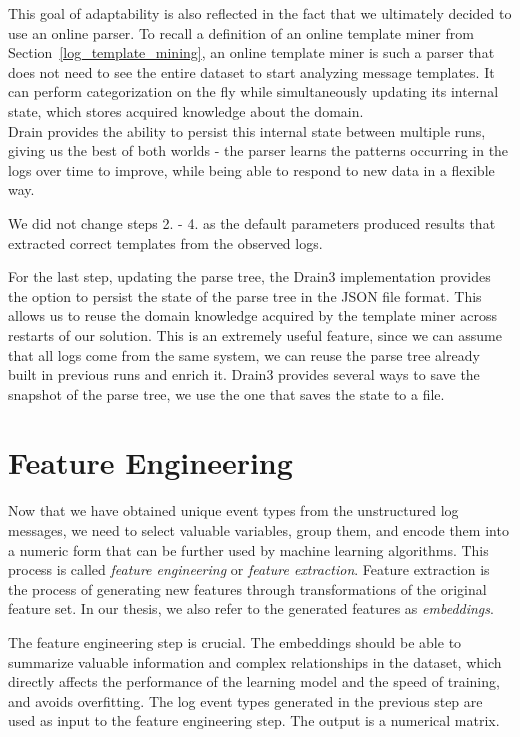 This goal of adaptability is also reflected in the fact that we ultimately decided to use an online parser.
To recall a definition of an online template miner from Section~\ref{log_template_mining}, an online template miner is such a parser that does not need to see the entire dataset to start analyzing message templates. It can perform categorization on the fly while simultaneously updating its internal state, which stores acquired knowledge about the domain.\\
Drain provides the ability to persist this internal state between multiple runs, giving us the best of both worlds - the parser learns the patterns occurring in the logs over time to improve, while being able to respond to new data in a flexible way.

We did not change steps 2. - 4. as the default parameters \cite{ibmdrain3} produced results that extracted correct templates from the observed logs.

For the last step, updating the parse tree, the Drain3 implementation provides the option to persist the state of the parse tree in the JSON file format. This allows us to reuse the domain knowledge acquired by the template miner across restarts of our solution.
This is an extremely useful feature, since we can assume that all logs come from the same system, we can reuse the parse tree already built in previous runs and enrich it.
Drain3 provides several ways to save the snapshot of the parse tree, we use the one that saves the state to a file.

\section{Feature Engineering}
\label{section:featureEngineering}
Now that we have obtained unique event types from the unstructured log messages, we need to select valuable variables, group them, and encode them into a numeric form that can be further used by machine learning algorithms. This process is called \textit{feature engineering} or \textit{feature extraction}. Feature extraction is the process of generating new features through transformations of the original feature set. In our thesis, we also refer to the generated features as \textit{embeddings}.

The feature engineering step is crucial. The embeddings should be able to summarize valuable information and complex relationships in the dataset, which directly affects the performance of the learning model and the speed of training, and avoids overfitting. The log event types generated in the previous step are used as input to the feature engineering step. The output is a numerical matrix. 

